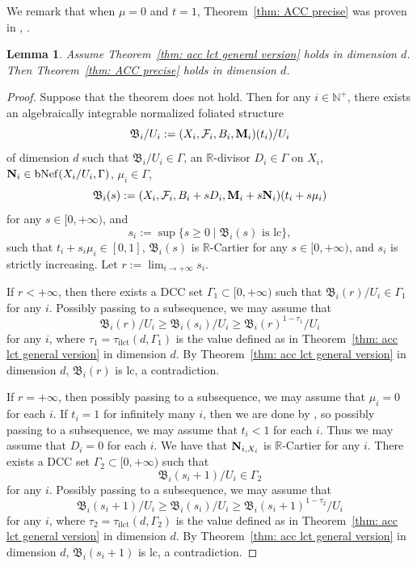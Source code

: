 \documentclass[11pt,reqno]{amsart}
\numberwithin{equation}{section}
\newcommand{\Mm}{{\bf{M}}}
\newcommand{\Nn}{{\bf{N}}}
\newcommand{\ilct}{\operatorname{ilct}}
\newcommand{\Bb}{{\mathfrak{B}}}
\newcommand{\Ff}{\mathcal{F}}
\newcommand{\Ii}{\Gamma}
\newcommand{\bNef}{\mathrm{bNef}}
\newtheorem{lem}[thm]{Lemma}
\theoremstyle{definition}
\begin{document}
We remark that when $\mu=0$ and $t=1$, Theorem~\ref{thm: ACC precise} was proven in \cite[Theorem~2.4.4]{CHLX23}, \cite[Theorem~1.1]{DLM23}.

\begin{lem}\label{lem: acc implies precise acc}
Assume Theorem~\ref{thm: acc lct general version} holds in dimension $d$. Then Theorem~\ref{thm: ACC precise} holds in dimension $d$.
\end{lem}
\begin{proof}
    Suppose that the theorem does not hold. Then for any $i\in\mathbb N^+$, there exists an algebraically integrable normalized foliated structure 
$$\Bb_i/U_i:=(X_i,\Ff_i,B_i,\Mm_i)(t_i)/U_i$$
of dimension $d$ such that $\Bb_i/U_i\in\Ii$, an $\mathbb R$-divisor $D_i\in\Ii$ on $X_i$, $\Nn_i\in\bNef(X_i/U_i,\Ii)$, $\mu_i\in\Ii$, 
$$\Bb_i(s):=(X_i,\Ff_i,B_i+sD_i,\Mm_i+s\Nn_i)(t_i+s\mu_i)$$
for any $s\in [0,+\infty)$, and
$$s_i:=\sup\{s\geq 0\mid \Bb_i(s)\text{ is lc}\},$$
such that $t_i+s_i\mu_i\in [0,1]$, $\Bb_i(s)$ is $\mathbb R$-Cartier for any $s\in [0,+\infty)$, and $s_i$ is strictly increasing. Let $r:=\lim_{i\rightarrow+\infty}s_i$. 

If $r<+\infty$, then there exists a DCC set $\Ii_1\subset [0,+\infty)$ such that $\Bb_i(r)/U_i\in\Ii_1$ for any $i$. Possibly passing to a subsequence, we may assume that
$$\Bb_i(r)/U_i\geq\Bb_i(s_i)/U_i\geq\Bb_i(r)^{1-\tau_1}/U_i$$
for any $i$, where $\tau_1=\tau_{\ilct}(d,\Ii_1)$ is the value defined as in Theorem~\ref{thm: acc lct general version} in dimension $d$. By Theorem~\ref{thm: acc lct general version} in dimension $d$, $\Bb_i(r)$ is lc, a contradiction. 

If $r=+\infty$, then possibly passing to a subsequence, we may assume that $\mu_i=0$ for each $i$. If $t_i=1$ for infinitely many $i$, then we are done by \cite[Theorem~2.4.4]{CHLX23}, so possibly passing to a subsequence, we may assume that $t_i<1$ for each $i$. Thus we may assume that $D_i=0$ for each $i$. We have that $\Nn_{i,X_i}$ is $\mathbb R$-Cartier for any $i$. There exists a DCC set $\Ii_2\subset [0,+\infty)$ such that 
$$\Bb_i(s_i+1)/U_i\in\Ii_2$$
for any $i$. Possibly passing to a subsequence, we may assume that
$$\Bb_i(s_i+1)/U_i\geq\Bb_i(s_i)/U_i\geq\Bb_i(s_i+1)^{1-\tau_2}/U_i$$
for any $i$, where $\tau_2=\tau_{\ilct}(d,\Ii_2)$ is the value defined as in Theorem~\ref{thm: acc lct general version} in dimension $d$. By Theorem~\ref{thm: acc lct general version} in dimension $d$, $\Bb_i(s_i+1)$ is lc, a contradiction.
\end{proof}
\end{document}
